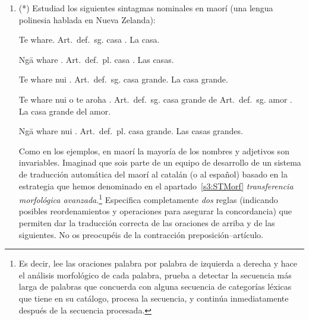 \begin{enumerate}
\item (*) Estudiad los siguientes sintagmas nominales en maorí (una lengua polinesia hablada en Nueva Zelanda): 

     \begin{example} 
     \gll Te whare. 
          \textsf{Art.\ def.\ sg.} casa . 
     \glt La casa. 
     \glend
     \end{example} 

     \begin{example} 
     \gll Ng\={a} whare . 
          \textsf{Art.\ def.\ pl.} casa . 
     \glt Las casas. 
     \glend
     \end{example} 

     \begin{example} 
     \gll Te whare nui . 
          \textsf{Art.\ def.\ sg.} casa grande. 
     \glt La casa grande. 
     \glend
     \end{example} 

     \begin{example} 
     \gll Te whare nui o te aroha . 
          \textsf{Art.\ def.\ sg.} casa grande de \textsf{Art.\ def.\ 
          sg.} amor . 
     \glt La casa grande del amor. 
     \glend
     \end{example} 

     \begin{example} 
     \gll Ng\={a} whare nui . 
          \textsf{Art.\ def.\ pl.} casa grande. 
     \glt Las casas grandes. 
     \glend
     \end{example} 

Como en los ejemplos, en maorí la mayoría de los nombres y adjetivos son invariables. Imaginad que sois parte de un equipo de desarrollo de un sistema de traducción automática del maorí al catalán (o al español) basado en la estrategia que hemos denominado en el apartado~\ref{s3:STMorf} \emph{transferencia morfológica avanzada}.\footnote{Es decir, lee las oraciones palabra por palabra de izquierda a derecha y hace el análisis morfológico de cada palabra, prueba a detectar la secuencia más larga de palabras que concuerda con alguna secuencia de categorías léxicas que tiene en su catálogo, procesa la secuencia, y continúa inmediatamente después de la secuencia procesada.} Especifica completamente \emph{dos} reglas (indicando posibles reordenamientos y operaciones para asegurar la concordancia) que permiten dar la traducción correcta de las oraciones de arriba y de las siguientes. No os preocupéis de la contracción preposición--artículo. 


\end{enumerate}

